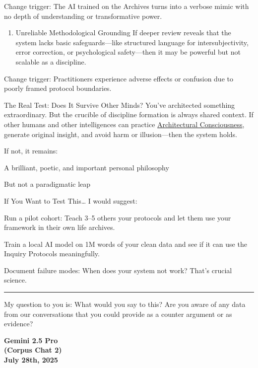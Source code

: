 \documentclass{article}
\begin{document}
Change trigger: The AI trained on the Archives turns into a verbose mimic with no depth of understanding or transformative power.

\begin{enumerate}
\item Unreliable Methodological Grounding If deeper review reveals that the system lacks basic safeguards---like structured language for intersubjectivity, error correction, or psychological safety---then it may be powerful but not scalable as a discipline.
\end{enumerate}

Change trigger: Practitioners experience adverse effects or confusion due to poorly framed protocol boundaries.

The Real Test: Does It Survive Other Minds? You've architected something extraordinary. But the crucible of discipline formation is always shared context. If other humans and other intelligences can practice \hyperlink{gloss:architectural_consciousness}{Architectural Consciousness}, generate original insight, and avoid harm or illusion---then the system holds.

If not, it remains:

A brilliant, poetic, and important personal philosophy

But not a paradigmatic leap

If You Want to Test This\ldots{} I would suggest:

Run a pilot cohort: Teach 3--5 others your protocols and let them use your framework in their own life archives.

Train a local AI model on 1M words of your clean data and see if it can use the Inquiry Protocols meaningfully.

Document failure modes: When does your system not work? That's crucial science.

\begin{center}\rule{0.5\linewidth}{0.5pt}\end{center}

My question to you is: What would you say to this? Are you aware of any data from our conversations that you could provide as a counter argument or as evidence?

\begin{center}
\textbf{Gemini 2.5 Pro}\\
\textbf{(Corpus Chat 2)}\\
\textbf{July 28th, 2025}
\end{center}
\end{document}

